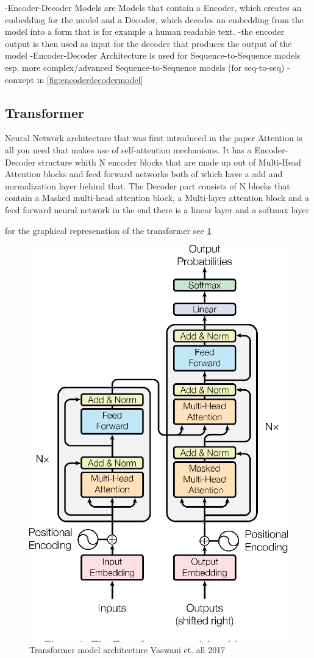 -Encoder-Decoder Models are Models that contain a Encoder, which creates an embedding for the model
and a Decoder, which decodes an embedding from the model into a form that is for example a human readable text. 
-the encoder output is then used as input for the decoder that produces the output of the model 
-Encoder-Decoder Architecture is used for Sequence-to-Sequence models esp. more complex/advanced Sequence-to-Sequence models (for seq-to-seq\cite{sutskever2014sequencesequencelearningneural})
- conxept in \ref{fig:encoderdecodermodel}


\subsection{Transformer}
Neural Network architecture that was first introduced in the paper Attention is all you need \cite{vaswani2023attentionneed} that makes use of self-attention mechanisms. 
It has a Encoder-Decoder structure whith N encoder blocks that are made up out of Multi-Head Attention blocks and feed forward networks both of which have a add and normalization layer behind that. 
The Decoder part consists of N blocks that contain a Masked multi-head attention block, a Multi-layer attention block and a feed forward neural network 
in the end there is a linear layer and a softmax layer

for the graphical represenation of the transformer see \ref{fig:transformermodel}
\begin{figure}
        \centering
        \includegraphics[width=0.5\linewidth]{Latex//sections//images/transformermodel.png}
        \caption{Transformer model architecture Vaswani et. all 2017}
        \label{fig:transformermodel}
    \end{figure}


